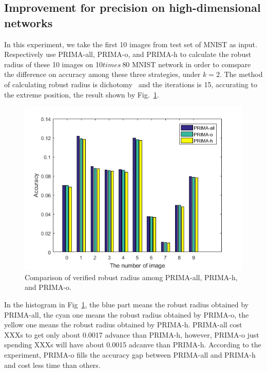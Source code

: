 \documentclass[runningheads]{llncs}
\begin{document}

\subsection{Improvement for precision on high-dimensional networks}

In this experiment, we take the first 10 images from test set of MNIST as input. Respectively use PRIMA-all, PRIMA-o, and PRIMA-h to calculate the robust radius of these 10 images on 10$times\ $80 MNIST network in order to comspare the difference on accuracy among these three strategies, under $k=2$. The method of calculating robust radius is dichotomy~\cite{ref_article5} and the iterations is 15, accurating to the extreme position, the result shown by Fig.~\ref{table2}.

\begin{figure}
\includegraphics[width=\textwidth]{Fig/FigR3_2.png}
\caption{Comparison of verified robust radius among PRIMA-all, PRIMA-h, and PRIMA-o.} \label{table2}
\end{figure}

In the histogram in Fig~\ref{table2}, the blue part means the robust radius obtained by PRIMA-all, the cyan one means the robust radius obtained by PRIMA-o, the yellow one means the robust radius obtained by PRIMA-h. PRIMA-all cost XXXs to get only about 0.0017 advance than PRIMA-h, however, PRIMA-o just spending XXXs will have about 0.0015 adcanve than PRIMA-h. According to the experiment, PRIMA-o fills the accuracy gap between PRIMA-all and PRIMA-h and cost less time than others.
\end{document}
